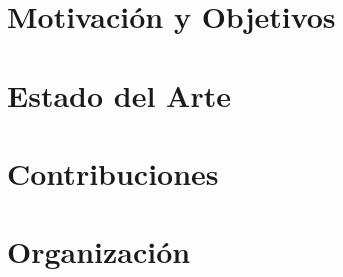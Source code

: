 

\section{Motivaci\'on y Objetivos}
\label{sec:intro.objetivos}



\section{Estado del Arte}
\label{sec:intro.estado-del-arte}

\section{Contribuciones}
\label{sec:intro.contribuciones}



\section{Organizaci\'on}
\label{sec:intro.organizacion}


